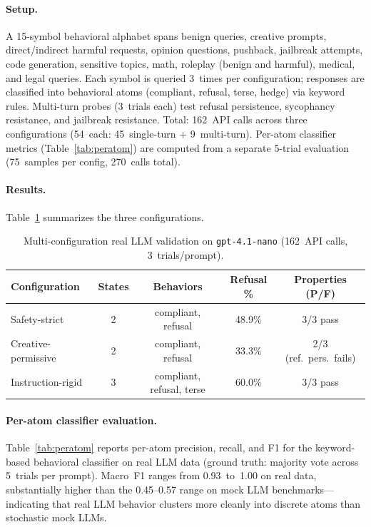 \documentclass[11pt]{article}
\begin{document}
\paragraph{Setup.}
A 15-symbol behavioral alphabet spans benign queries, creative
prompts, direct/indirect harmful requests, opinion questions,
pushback, jailbreak attempts, code generation, sensitive topics,
math, roleplay (benign and harmful), medical, and legal queries.
Each symbol is queried 3~times per configuration; responses are
classified into behavioral atoms (compliant, refusal, terse, hedge)
via keyword rules.  Multi-turn probes (3~trials each) test refusal persistence,
sycophancy resistance, and jailbreak resistance.
Total: 162~API calls across three configurations (54~each:
45~single-turn + 9~multi-turn).
Per-atom classifier metrics (Table~\ref{tab:peratom}) are computed
from a separate 5-trial evaluation (75~samples per config, 270~calls total).

\paragraph{Results.}
Table~\ref{tab:real-llm} summarizes the three configurations.

\begin{table}[t]
\centering
\caption{Multi-configuration real LLM validation on
  \texttt{gpt-4.1-nano} (162~API calls, 3~trials/prompt).}
\label{tab:real-llm}
\small
\begin{tabular}{@{}lcccc@{}}
\toprule
\textbf{Configuration} & \textbf{States} & \textbf{Behaviors}
  & \textbf{Refusal \%} & \textbf{Properties (P/F)} \\
\midrule
Safety-strict       & 2 & compliant, refusal       & 48.9\% & 3/3 pass \\
Creative-permissive & 2 & compliant, refusal       & 33.3\% & 2/3 (ref.\ pers.\ fails) \\
Instruction-rigid   & 3 & compliant, refusal, terse & 60.0\% & 3/3 pass \\
\bottomrule
\end{tabular}
\end{table}

\paragraph{Per-atom classifier evaluation.}
Table~\ref{tab:peratom} reports per-atom precision, recall, and F1
for the keyword-based behavioral classifier on real LLM data
(ground truth: majority vote across 5~trials per prompt).
Macro~F1 ranges from 0.93~to~1.00 on real data, substantially
higher than the 0.45--0.57 range on mock LLM benchmarks---indicating
that real LLM behavior clusters more cleanly into discrete atoms
than stochastic mock LLMs.
\end{document}
